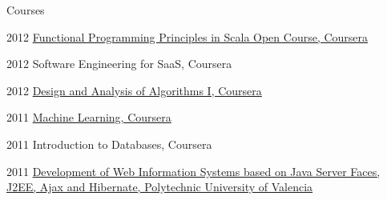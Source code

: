 \begin{cvlist}{Courses}
  \item[2012] \href{https://www.coursera.org/specializations/scala}{Functional Programming Principles in Scala Open Course, Coursera}
  \item[2012] Software Engineering for SaaS, Coursera\footnotemark[2]
  \item[2012] \href{https://www.coursera.org/learn/algorithm-design-analysis}{Design and Analysis of Algorithms I, Coursera}
  \item[2011] \href{https://www.coursera.org/learn/machine-learning}{Machine Learning, Coursera}
  \item[2011] Introduction to Databases, Coursera\footnotemark[2]
  \item[2011] \href{http://www.cfp.upv.es/formacion-permanente/index/index.jsp}{Development of Web Information Systems based on Java Server Faces, J2EE, Ajax and Hibernate, Polytechnic University of Valencia}
\end{cvlist}